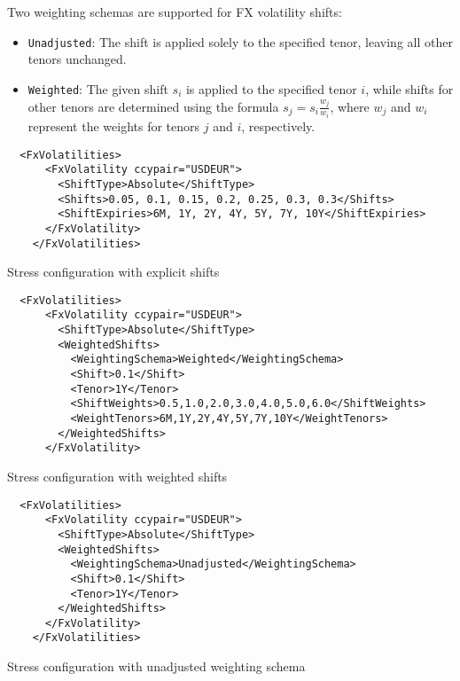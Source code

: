 Two weighting schemas are supported for FX volatility shifts: 
\begin{itemize} 
\item {\tt Unadjusted}: The shift is applied solely to the specified tenor, leaving all other tenors unchanged. 
\item {\tt Weighted}: The given shift $s_i$ is applied to the specified tenor $i$, while shifts for other tenors are determined using the formula $s_j = s_i \frac{w_j}{w_i}$, where $w_j$ and $w_i$ represent the weights for tenors $j$ and $i$, respectively. 
\end{itemize}

\begin{listing}
\begin{verbatim}
  <FxVolatilities>
      <FxVolatility ccypair="USDEUR">
        <ShiftType>Absolute</ShiftType>
        <Shifts>0.05, 0.1, 0.15, 0.2, 0.25, 0.3, 0.3</Shifts>
        <ShiftExpiries>6M, 1Y, 2Y, 4Y, 5Y, 7Y, 10Y</ShiftExpiries>
      </FxVolatility>
    </FxVolatilities>
\end{verbatim}
\caption{Stress configuration with explicit shifts}
\label{lst:stress_config_fxvol_explicit}
\end{listing}


\begin{listing}
\begin{verbatim}
  <FxVolatilities>
      <FxVolatility ccypair="USDEUR">
        <ShiftType>Absolute</ShiftType>
        <WeightedShifts>
          <WeightingSchema>Weighted</WeightingSchema>
          <Shift>0.1</Shift>
          <Tenor>1Y</Tenor>
          <ShiftWeights>0.5,1.0,2.0,3.0,4.0,5.0,6.0</ShiftWeights>
          <WeightTenors>6M,1Y,2Y,4Y,5Y,7Y,10Y</WeightTenors>
        </WeightedShifts>
      </FxVolatility>
\end{verbatim}
\caption{Stress configuration with weighted shifts}
\label{lst:stress_config_fxvol_weighting}
\end{listing}

\begin{listing}
\begin{verbatim}
  <FxVolatilities>
      <FxVolatility ccypair="USDEUR">
        <ShiftType>Absolute</ShiftType>
        <WeightedShifts>
          <WeightingSchema>Unadjusted</WeightingSchema>
          <Shift>0.1</Shift>
          <Tenor>1Y</Tenor>
        </WeightedShifts>
      </FxVolatility>
    </FxVolatilities>
\end{verbatim}
\caption{Stress configuration with unadjusted weighting schema}
\label{lst:stress_config_fxvol_weighting_off}
\end{listing}

